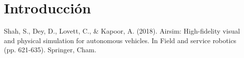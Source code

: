 \documentclass[12pt,letterpaper]{report}
\begin{document}
\chapter{Introducción} %

%
%
%
%
%
%
\begin{thebibliography}{0}

   Shah, S., Dey, D., Lovett, C., \& Kapoor, A. (2018). Airsim: High-fidelity visual and physical simulation for autonomous vehicles. In Field and service robotics (pp. 621-635). Springer, Cham.
  
\end{thebibliography}
\end{document}
